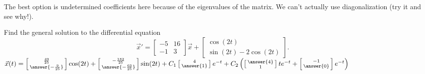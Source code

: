 \documentclass{ximera}
\begin{document}
\begin{exercise}
    \begin{hint}
        The best option is undetermined coefficients here because of the eigenvalues of the matrix. We can't actually use diagonalization (try it and see why!).
    \end{hint}
    Find the general solution to the differential equation
    \begin{equation*}
        {\vec{x}}' = \begin{bmatrix} -5 & 16 \\ -1 & 3 \end{bmatrix} \vec{x} + \begin{bmatrix} \cos(2t) \\ \sin(2t) - 2\cos(2t) \end{bmatrix}. 
    \end{equation*}
    $\vec{x}(t) = \left[\begin{smallmatrix} \frac{49}{25} \\ \answer{-\frac{9}{25}} \end{smallmatrix}\right]\cos(2t) + \left[\begin{smallmatrix} -\frac{182}{25} \\ \answer{-\frac{63}{25}} \end{smallmatrix}\right]\sin(2t) + C_1\left[\begin{smallmatrix} 4 \\ \answer{1} \end{smallmatrix}\right]e^{-t} + C_2\left(\left[\begin{smallmatrix} \answer{4} \\ 1 \end{smallmatrix}\right]te^{-t} + \left[\begin{smallmatrix} -1 \\ \answer{0} \end{smallmatrix}\right]e^{-t}\right)$
\end{exercise}
\end{document}
